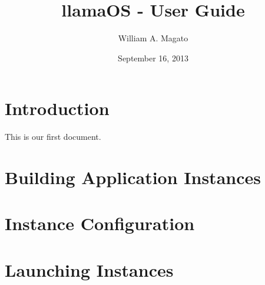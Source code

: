 \documentclass[draft]{article}
\begin{document}
\title{llamaOS - User Guide}
\author{William A. Magato}
\date{September 16, 2013}
\maketitle

\tableofcontents
\clearpage

\section{Introduction}
This is our first document.

\section{Building Application Instances}

\section{Instance Configuration}

\section{Launching Instances}
\end{document}
